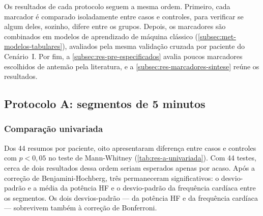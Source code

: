 Os resultados de cada protocolo seguem a mesma ordem. Primeiro, cada
marcador é comparado isoladamente entre casos e controles, para verificar
se algum deles, sozinho, difere entre os grupos. Depois, os marcadores são
combinados em modelos de aprendizado de máquina clássico
(\autoref{subsec:met-modelos-tabulares}), avaliados pela mesma validação
cruzada por paciente do Cenário~I. Por fim, a
\autoref{subsec:res-pre-especificados} avalia poucos marcadores escolhidos
de antemão pela literatura, e a \autoref{subsec:res-marcadores-sintese}
reúne os resultados.

\subsection{Protocolo A: segmentos de 5 minutos}
\label{subsec:res-protocolo-a}

\subsubsection{Comparação univariada}

Dos 44 resumos por paciente, oito apresentaram diferença entre casos e
controles com $p < 0{,}05$ no teste de Mann-Whitney
(\autoref{tab:res-a-univariada}). Com 44 testes, cerca de dois resultados
dessa ordem seriam esperados apenas por acaso. Após a correção de
Benjamini-Hochberg, três permaneceram significativos: o desvio-padrão e a
média da potência HF e o desvio-padrão da frequência cardíaca entre os
segmentos. Os dois desvios-padrão --- da potência HF e da frequência
cardíaca --- sobrevivem também à correção de Bonferroni.

